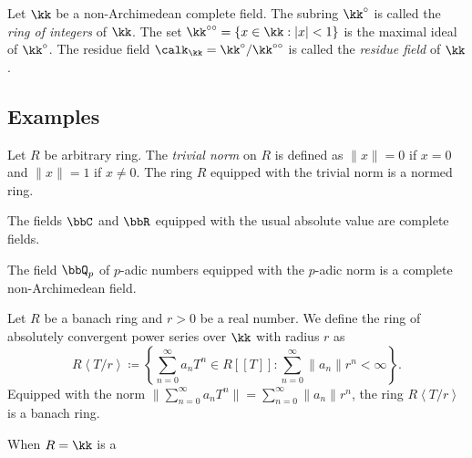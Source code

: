     \begin{definition}\label{def:ring_of_integers_of_non-archimedean_field}
        Let \(\kk\) be a non-Archimedean complete field.
        The subring \(\kk^\circ\) is called the \emph{ring of integers} of \(\kk\).
        The set \(\kk^{\circ\circ} = \{x \in \kk : |x| < 1\}\) is the maximal ideal of \(\kk^\circ\).
        The residue field \(\calk_\kk = \kk^\circ / \kk^{\circ\circ}\) is called the \emph{residue field} of \(\kk\).
    \end{definition}



\subsection{Examples}

    \begin{example}\label{eg:trivial_normed_rings}
        Let \(R\) be arbitrary ring.
        The \emph{trivial norm} on \(R\) is defined as \(\|x\| = 0\) if \(x = 0\) and \(\|x\| = 1\) if \(x \neq 0\).
        The ring \(R\) equipped with the trivial norm is a normed ring.
    \end{example}

    \begin{example}\label{eg:C_and_R_as_complete_fields}
        The fields \(\bbC\) and \(\bbR\) equipped with the usual absolute value are complete fields.
    \end{example}

    \begin{example}\label{eg:p-adic_fields_as_complete_fields}
        The field \(\bbQ_p\) of \(p\)-adic numbers equipped with the \(p\)-adic norm is a complete non-Archimedean field.
    \end{example}

    \begin{example}\label{eg:ring_of_absolutely_convergent_power_series_as_banach_rings}
        Let \(R\) be a banach ring and \(r > 0\) be a real number.
        We define the ring of absolutely convergent power series over \(\kk\) with radius \(r\) as
        \[ R\left<T/r\right> \coloneqq \left\{\sum_{n=0}^{\infty} a_n T^n \in R[[T]] : \sum_{n=0}^{\infty} \|a_n\| r^n < \infty \right\}. \]
        Equipped with the norm \(\|\sum_{n=0}^{\infty} a_n T^n\| = \sum_{n=0}^{\infty} \|a_n\| r^n\), the ring \(R\left<T/r\right>\) is a banach ring.

        When \(R = \kk\) is a 
    \end{example}

